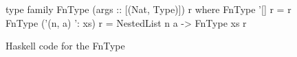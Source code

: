 \begin{figure}
    \begin{hskcode}
    type family FnType (args :: [(Nat, Type)]) r where
        FnType '[] r = r
        FnType ('(n, a) ': xs) r = NestedList n a -> FnType xs r
    \end{hskcode}
    \caption{Haskell code for the FnType}
    \label{fig:fntype}
\end{figure}